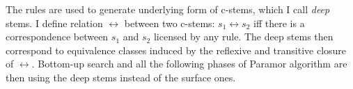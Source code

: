 The rules are used to generate underlying form of c-stems, which I call \emph{deep} stems.  I define relation $\leftrightarrow$ between two c-stems: $s_1 \leftrightarrow s_2$ iff there is a correspondence between $s_1$ and $s_2$ licensed by any rule. The deep stems then correspond to equivalence classes induced by the reflexive and transitive closure of $\leftrightarrow$.
%
%
%
%
Bottom-up search and all the following phases of Paramor algorithm are then using the deep stems instead of the surface ones.

